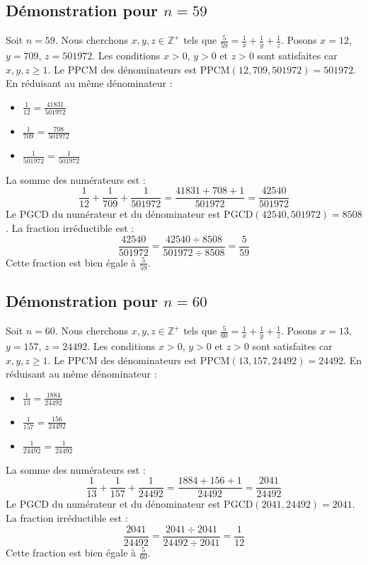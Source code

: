 \documentclass[11pt,a4paper]{article}
\begin{document}
\subsection{Démonstration pour $n = 59$}
Soit $n = 59$. Nous cherchons $x, y, z \in \mathbb{Z}^{+}$ tels que $\frac{5}{59} = \frac{1}{x} + \frac{1}{y} + \frac{1}{z}$.
Posons $x = 12$, $y = 709$, $z = 501972$.
Les conditions $x > 0$, $y > 0$ et $z > 0$ sont satisfaites car $x, y, z \geq 1$.
Le PPCM des dénominateurs est $\text{PPCM}(12, 709, 501972) = 501972$.
En réduisant au même dénominateur :
\begin{itemize}
    \item $\frac{1}{12} = \frac{41831}{501972}$
    \item $\frac{1}{709} = \frac{708}{501972}$
    \item $\frac{1}{501972} = \frac{1}{501972}$
\end{itemize}
La somme des numérateurs est :
$$ \frac{1}{12} + \frac{1}{709} + \frac{1}{501972} = \frac{41831 + 708 + 1}{501972} = \frac{42540}{501972} $$
Le PGCD du numérateur et du dénominateur est $\text{PGCD}(42540, 501972) = 8508$.
La fraction irréductible est :
$$ \frac{42540}{501972} = \frac{42540 \div 8508}{501972 \div 8508} = \frac{5}{59} $$
Cette fraction est bien égale à $\frac{5}{59}$.

\subsection{Démonstration pour $n = 60$}
Soit $n = 60$. Nous cherchons $x, y, z \in \mathbb{Z}^{+}$ tels que $\frac{5}{60} = \frac{1}{x} + \frac{1}{y} + \frac{1}{z}$.
Posons $x = 13$, $y = 157$, $z = 24492$.
Les conditions $x > 0$, $y > 0$ et $z > 0$ sont satisfaites car $x, y, z \geq 1$.
Le PPCM des dénominateurs est $\text{PPCM}(13, 157, 24492) = 24492$.
En réduisant au même dénominateur :
\begin{itemize}
    \item $\frac{1}{13} = \frac{1884}{24492}$
    \item $\frac{1}{157} = \frac{156}{24492}$
    \item $\frac{1}{24492} = \frac{1}{24492}$
\end{itemize}
La somme des numérateurs est :
$$ \frac{1}{13} + \frac{1}{157} + \frac{1}{24492} = \frac{1884 + 156 + 1}{24492} = \frac{2041}{24492} $$
Le PGCD du numérateur et du dénominateur est $\text{PGCD}(2041, 24492) = 2041$.
La fraction irréductible est :
$$ \frac{2041}{24492} = \frac{2041 \div 2041}{24492 \div 2041} = \frac{1}{12} $$
Cette fraction est bien égale à $\frac{5}{60}$.
\end{document}
